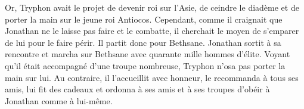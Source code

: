 Or, Tryphon avait le projet de devenir roi sur l’Asie,
	de ceindre le diadème et de porter la main sur le jeune roi Antiocos.
Cependant, comme il craignait que Jonathan ne le laisse pas faire et le combatte,
	il cherchait le moyen de s’emparer de lui pour le faire périr.
	Il partit donc pour Bethsane.
Jonathan sortit à sa rencontre et marcha sur Bethsane avec quarante mille hommes d’élite.
Voyant qu’il était accompagné d’une troupe nombreuse,
	Tryphon n’osa pas porter la main sur lui.
Au contraire, il l’accueillit avec honneur,
	le recommanda à tous ses amis, lui fit des cadeaux
	et ordonna à ses amis et à ses troupes d’obéir à Jonathan comme à lui-même.
